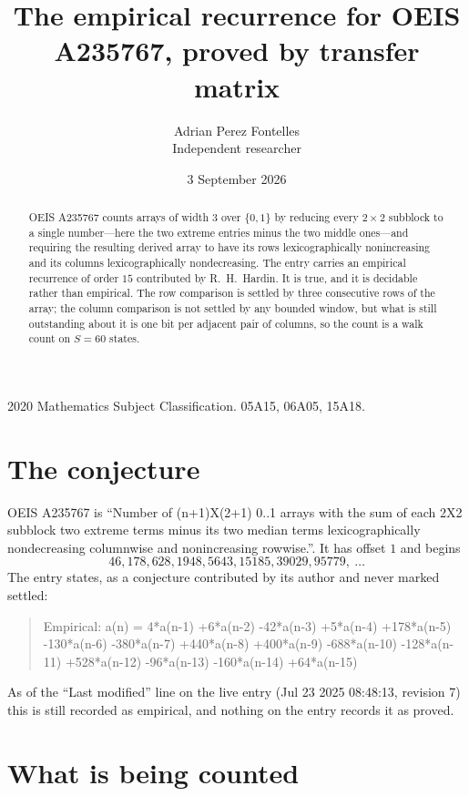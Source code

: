 \documentclass[11pt,a4paper]{article}
\title{The empirical recurrence for OEIS A235767, proved by transfer matrix}
\author{Adrian Perez Fontelles\\ \small Independent researcher}
\date{3 September 2026}
\theoremstyle{plain}
\theoremstyle{definition}
\begin{document}
\maketitle

\begin{abstract}
OEIS A235767 counts arrays of width $3$ over $\{0,1\}$ by reducing every $2\times2$ subblock to a
single number---here the two extreme entries minus the two middle ones---and requiring the resulting derived array to have its rows
lexicographically nonincreasing and its columns lexicographically nondecreasing. The entry carries an
empirical recurrence of order $15$ contributed by R.~H.~Hardin. It is true, and it is
decidable rather than empirical. The row comparison is settled by three consecutive rows of the
array; the column comparison is not settled by any bounded window, but what is still outstanding
about it is one bit per adjacent pair of columns, so the count is a walk count on $S=60$
states.
\end{abstract}

\noindent\small 2020 Mathematics Subject Classification. 05A15, 06A05, 15A18.\normalsize

\section{The conjecture}

OEIS A235767 is ``Number of (n+1)X(2+1) 0..1 arrays with the sum of each 2X2 subblock two extreme terms minus its two median terms lexicographically nondecreasing columnwise and nonincreasing rowwise.''. It has offset $1$ and begins
\[
46, 178, 628, 1948, 5643, 15185, 39029, 95779,\ \dots
\]
The entry states, as a conjecture contributed by its author and never marked settled:
\begin{quote}
Empirical: a(n) = 4*a(n-1) +6*a(n-2) -42*a(n-3) +5*a(n-4) +178*a(n-5) -130*a(n-6) -380*a(n-7) +440*a(n-8) +400*a(n-9) -688*a(n-10) -128*a(n-11) +528*a(n-12) -96*a(n-13) -160*a(n-14) +64*a(n-15)
\end{quote}
As of the ``Last modified'' line on the live entry (Jul 23 2025 08:48:13, revision 7) this is still
recorded as empirical, and nothing on the entry records it as proved.

\section{What is being counted}
\end{document}
